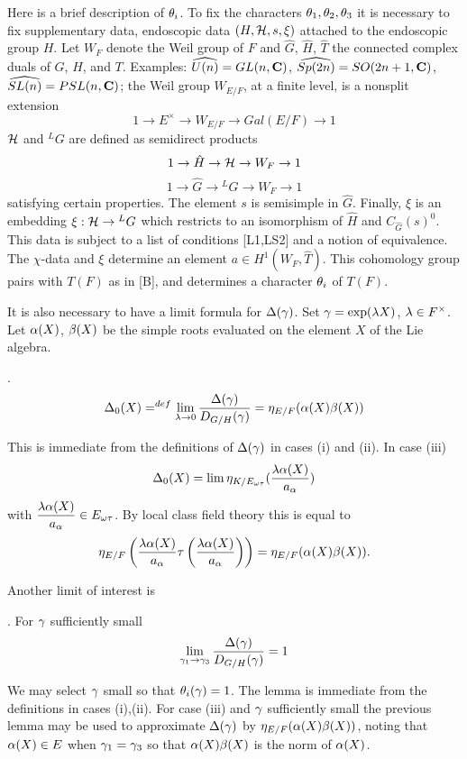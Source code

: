 Here is a brief description of ${\theta}_i$.  
To fix the characters ${\theta}_1,{\theta}_2,{\theta}_3$ it is 
necessary to fix supplementary data, endoscopic data $(H,{\cal H},s,\xi)$
attached to the endoscopic group $H$.  Let $W_F$ denote the
Weil group of $F$ and $\hat G$, $\hat H$, $\hat T$ the connected
complex duals of $G$, $H$, and $T$.  Examples: $\widehat {U(n)} = GL(n,{\bf{C}})$, 
$\widehat{Sp(2n) } = SO(2n+1,{\bf{C}})$, $\widehat{SL(n)} = PSL(n,{\bf{C}})$;
the Weil group $W_{E/F}$, at a finite level, is a nonsplit extension
$$1 \to E^\times \to W_{E/F} \to Gal(E/F) \to 1$$
${\cal H}$ and ${}^LG$ are defined as semidirect products
$$1 \to \hat H \to {\cal H} \to W_F \to 1$$
$$1 \to \hat G \to {}^LG \to W_F \to 1$$
satisfying certain properties.  The element $s$ is semisimple in $\hat G$.
Finally, $\xi$ is an embedding $\xi: {\cal H} \to {}^LG$ which
restricts to an isomorphism of $\hat H$ and $C_{\hat G}(s)^0$.   This 
data is subject to a list of conditions [L1,LS2] and a notion of
equivalence.  The $\chi$-data and $\xi$ determine an element
$a\in H^1(W_F,\hat T)$.  This cohomology group pairs with $T(F)$ as
in [B], and determines a character ${\theta}_i$ of $T(F)$.


It is also necessary to have a limit formula for $\Delta({\gamma})$.
Set ${\gamma} = \exp({\lambda} X)$, ${\lambda} \in F^\times$.  Let ${\alpha}(X)$, ${\beta}(X)$
be the simple roots evaluated on the element $X$ of the Lie algebra.

.  $$\Delta_0(X) =^{def} \lim_{{\lambda}\to 0} {\Delta({\gamma})
\over D_{G/H}({\gamma})} = {\eta_{E/F}}({\alpha}(X){\beta}(X))$$

\proof   This is immediate from the definitions of $\Delta({\gamma})$ in 
cases (i) and (ii).  In case (iii) 
$$\Delta_0(X) = \lim \eta_{K/E_{\omega\tau}}
(\displaystyle {{\lambda}{\alpha}(X)\over a_{\alpha}})$$ with $\displaystyle {{\lambda}{\alpha}(X)
\over a_{\alpha}}\in E_{\omega\tau}$.  By local class field theory this is
equal to $${\eta_{E/F}}\left(\displaystyle { {{\lambda}{\alpha}(X) \over a_{\alpha}} \tau \left(
{{\lambda}{\alpha}(X) \over a_{\alpha}}\right)}\right) = {\eta_{E/F}}({\alpha}(X){\beta}(X)).$$

\smallskip
Another limit of interest is

.  For ${\gamma}$ sufficiently small $$\lim_{{\gamma}_1\to{\gamma}_3}
{\Delta({\gamma})\over D_{G/H}({\gamma})} =1$$

\proof  We may select ${\gamma}$ small so that ${\theta}_i({\gamma})=1$.  
The lemma is immediate from the definitions in cases (i),(ii).
For case (iii) and ${\gamma}$ sufficiently small the previous lemma
may be used to approximate $\Delta({\gamma})$ by ${\eta_{E/F}}({\alpha}(X){\beta}(X))$, 
noting that ${\alpha}(X)\in E$ when ${\gamma}_1={\gamma}_3$ so that ${\alpha}(X){\beta}(X)$ is
the norm of ${\alpha}(X)$.

